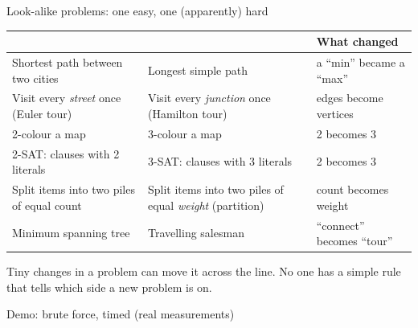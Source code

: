 \begin{frame}{Look-alike problems: one easy, one (apparently) hard}
\begin{sfig}[0.62]
\begin{tabular}{@{}L{43mm}L{43mm}L{58mm}@{}}
\toprule
{} &  & \textbf{What changed}\\\midrule
Shortest path between two cities & Longest simple path & a ``min'' became a ``max''\\
Visit every \emph{street} once (Euler tour) & Visit every \emph{junction} once (Hamilton tour) & edges become vertices\\
2-colour a map & 3-colour a map & 2 becomes 3\\
2-SAT: clauses with 2 literals & 3-SAT: clauses with 3 literals & 2 becomes 3\\
Split items into two piles of equal count & Split items into two piles of equal \emph{weight} (partition) & count becomes weight\\
Minimum spanning tree & Travelling salesman & ``connect'' becomes ``tour''\\\bottomrule
\end{tabular}
\end{sfig}
\vspace{2mm}
{\small Tiny changes in a problem can move it across the line. No one has a simple rule that tells which side a new problem is on.}
\end{frame}

\begin{frame}{Demo: brute force, timed (real measurements)}
\begin{columns}[T]
\begin{column}{0.5\textwidth}
\vspace{1mm}
\vspace{2mm}

\vspace{1mm}\pyline
\end{column}
\begin{column}{0.48\textwidth}
\end{column}
\end{columns}
\end{frame}


